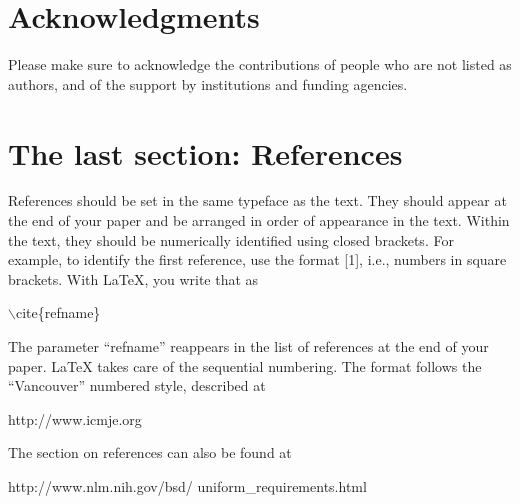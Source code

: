 \documentclass[letterpaper,10pt,twocolumn]{../aspe}
\begin{document}
\section*{Acknowledgments}
Please make sure to acknowledge the contributions of people who are not
listed as authors, and of the support by institutions and funding agencies.

\section*{The last section: References}
References should be set in the same typeface as the text. They should appear
at the end of your paper and be arranged in order of appearance in the
text. Within the text, they should be numerically identified using closed
brackets. For example, to identify the first reference, use the
format [1], i.e., numbers in square brackets.
With LaTeX, you write that as

\hspace*{3mm}$\backslash$cite\{refname\}

The parameter ``refname'' reappears in the list of references at the
end of your paper.  LaTeX takes care of the sequential numbering.
The format follows the ``Vancouver'' numbered style, described at

http://www.icmje.org

The section on references can also be found at

http://www.nlm.nih.gov/bsd/\linebreak
\hspace*{1.2in}uniform\_requirements.html

\end{document}
